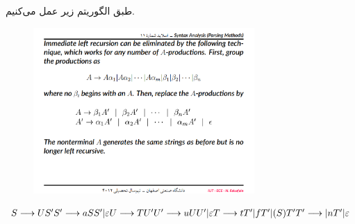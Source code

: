 \documentclass{article}
\begin{document}
\subsection{}
طبق الگوریتم زیر عمل می‌کنیم.
\begin{figure}[H]
    \centering
    \includegraphics[width=0.75\textwidth]{figures/1b.png}
    \caption
	{}
    \label{fig:fig1}
\end{figure}

\begin{latin}
$
S \longrightarrow US ^ \prime \\
S ^ \prime \longrightarrow aSS ^ \prime | \varepsilon \\
U \longrightarrow TU ^ \prime \\
U ^ \prime \longrightarrow uUU ^ \prime | \varepsilon \\
T \longrightarrow tT ^ \prime | fT ^ \prime | (S)T ^ \prime \\
T ^ \prime \longrightarrow | nT ^ \prime | \varepsilon
$
\end{latin}

\section{}%

\section{}%
\end{document}
